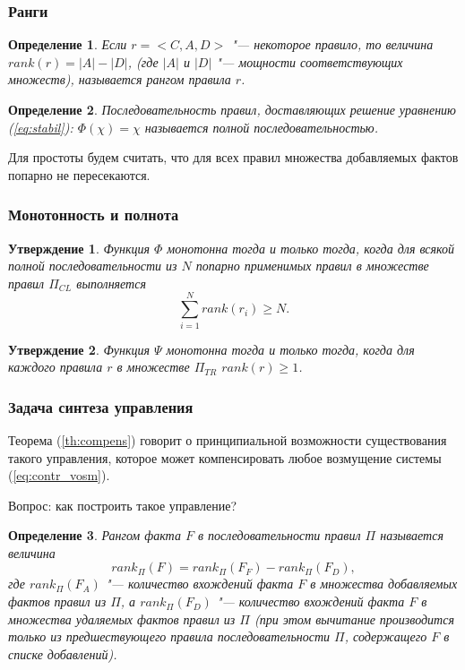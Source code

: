 \documentclass[default]{beamer}
\newtheorem{Pred}{Утверждение}
\newtheorem{Def}{Определение}
\begin{document}
	\begin{frame}
		\frametitle{Ранги}
		
		\begin{Def}
			Если $r=<C,A,D>$ "--- некоторое правило, то величина $rank(r) = |A|-|D|$, (где $|A|$ и $|D|$ "--- мощности соответствующих множеств), называется рангом правила $r$. 
		\end{Def}
		
		\begin{Def}
			Последовательность правил, доставляющих решение уравнению (\ref{eq:stabil}): $\Phi(\chi)=\chi$ называется полной последовательностью.
		\end{Def}
		\par\bigskip
		Для простоты будем считать, что для всех правил множества добавляемых фактов попарно не пересекаются.
	\end{frame}

	\begin{frame}
		\frametitle{Монотонность и полнота}
		
		\begin{Pred}
			Функция $\Phi$ монотонна тогда и только тогда, когда для всякой полной последовательности из $N$ попарно применимых правил в множестве правил $\Pi_{CL}$ выполняется
			\begin{equation}
				\sum_{i=1}^{N}rank(r_i)\geqslant N.
			\end{equation}
		\end{Pred}
		
		\begin{Pred}
			Функция $\Psi$ монотонна тогда и только тогда, когда для каждого правила $r$ в множестве $\Pi_{TR}$ $rank(r)\geqslant 1$.
		\end{Pred}
	\end{frame}

	\begin{frame}
		\frametitle{Задача синтеза управления}
		
		Теорема (\ref{th:compens}) говорит о принципиальной возможности существования такого управления, которое может компенсировать любое возмущение системы (\ref{eq:contr_vosm}).
		
		Вопрос: как построить такое управление?
		
		\begin{Def}
			Рангом факта $F$ в последовательности правил $\Pi$ называется величина
			\begin{equation}
				rank_{\Pi}(F)=rank_{\Pi}(F_F)-rank_{\Pi}(F_D),
			\end{equation}
			где $rank_{\Pi}(F_A)$ "--- количество вхождений факта $F$ в множества добавляемых фактов правил из $\Pi$, а $rank_{\Pi}(F_D)$ "--- количество вхождений факта $F$ в множества удаляемых фактов правил из $\Pi$ (при этом вычитание производится только из предшествующего правила последовательности $\Pi$, содержащего $F$ в списке добавлений).
		\end{Def}
	\end{frame}
\end{document}
